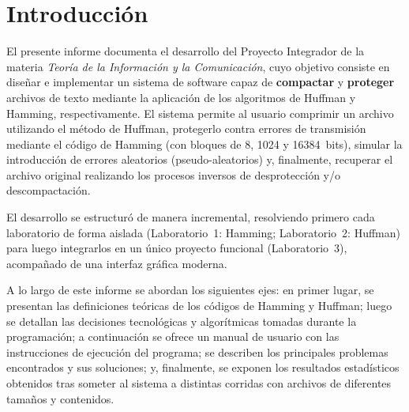 \chapter*{Introducción}


El presente informe documenta el desarrollo del Proyecto Integrador de la materia \textit{Teoría de la Información y la Comunicación}, cuyo objetivo consiste en diseñar e implementar un sistema de software capaz de \textbf{compactar} y \textbf{proteger} archivos de texto mediante la aplicación de los algoritmos de Huffman y Hamming, respectivamente. El sistema permite al usuario comprimir un archivo utilizando el método de Huffman, protegerlo contra errores de transmisión mediante el código de Hamming (con bloques de 8, 1024 y 16384~bits), simular la introducción de errores aleatorios (pseudo-aleatorios) y, finalmente, recuperar el archivo original realizando los procesos inversos de desprotección y/o descompactación.

El desarrollo se estructuró de manera incremental, resolviendo primero cada laboratorio de forma aislada (Laboratorio~1: Hamming; Laboratorio~2: Huffman) para luego integrarlos en un único proyecto funcional (Laboratorio~3), acompañado de una interfaz gráfica moderna.

A lo largo de este informe se abordan los siguientes ejes: en primer lugar, se presentan las definiciones teóricas de los códigos de Hamming y Huffman; luego se detallan las decisiones tecnológicas y algorítmicas tomadas durante la programación; a continuación se ofrece un manual de usuario con las instrucciones de ejecución del programa; se describen los principales problemas encontrados y sus soluciones; y, finalmente, se exponen los resultados estadísticos obtenidos tras someter al sistema a distintas corridas con archivos de diferentes tamaños y contenidos.